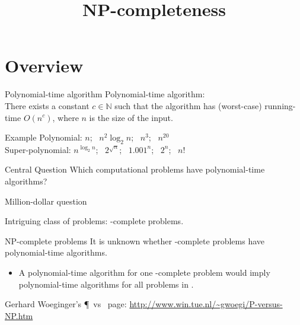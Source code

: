 


\title[NP-completeness]
{NP-completeness}

\begin{frame}
	\titlepage
\end{frame}

\lecturenotes{\maketitle}

\begin{frame}
	\tableofcontents
\end{frame}


\section{Overview}

\begin{frame}
	\begin{block}{Polynomial-time algorithm}
		Polynomial-time algorithm:\\
		There exists a constant $c\in \mathbb{N}$ such that the algorithm has (worst-case) running-time $O(n^c)$, where $n$ is the size of the input.
	\end{block}

	\pause
	\begin{block}{Example}
		Polynomial: $n$; ~$n^2 \log_2 n$; ~$n^3$; ~$n^{20}$\\
		Super-polynomial: $n^{\log_2 n}$; ~$2^{\sqrt{n}}$; ~$1.001^n$; ~$2^n$; ~$n!$
	\end{block}

\end{frame}


\begin{frame}

	\begin{block}{Central Question}
		Which computational problems have polynomial-time algorithms?
	\end{block}

\end{frame}

\begin{frame}{Million-dollar question}

	Intriguing class of problems: \NP-complete problems.

	\begin{block}{NP-complete problems}
		It is unknown whether \NP-complete problems have polynomial-time algorithms.
		\begin{itemize}
			\item A polynomial-time algorithm for one \NP-complete problem would imply polynomial-time algorithms for all problems in \NP.
		\end{itemize}
	\end{block}

	Gerhard Woeginger's \P\ vs \NP\ page: \url{http://www.win.tue.nl/~gwoegi/P-versus-NP.htm}

\end{frame}


